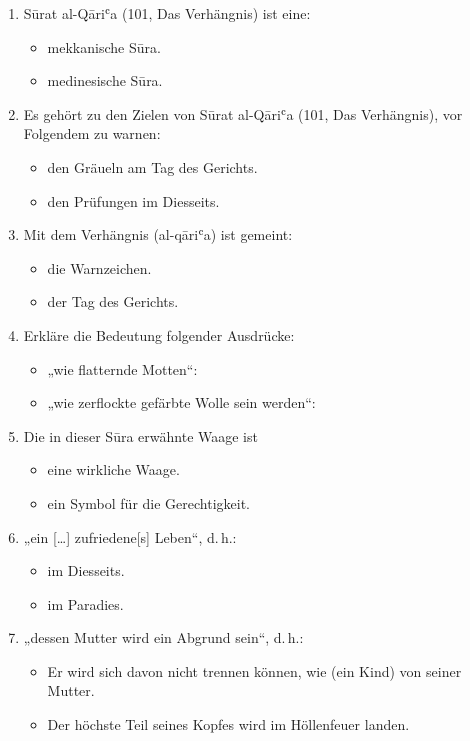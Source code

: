 \begin{enumerate}[leftmargin=1.6em,resume]
\item Sūrat al-Qāriʿa (101, Das Verhängnis) ist eine:
  \begin{itemize}
    \item mekkanische Sūra. \item medinesische Sūra.
  \end{itemize}
\item Es gehört zu den Zielen von Sūrat al-Qāriʿa (101, Das Verhängnis), vor Folgendem zu
  warnen:
  \begin{itemize}
    \item den Gräueln am Tag des Gerichts. \item den Prüfungen im Diesseits.
  \end{itemize}
\item Mit dem Verhängnis (al-qāriʿa) ist gemeint:
  \begin{itemize}
    \item die Warnzeichen. \item der Tag des Gerichts.
  \end{itemize}
\item Erkläre die Bedeutung folgender Ausdrücke:
  \begin{itemize}
    \item „wie flatternde Motten“: \dotfill
    \item „wie zerflockte gefärbte Wolle sein werden“: \dotfill
  \end{itemize}
\item Die in dieser Sūra erwähnte Waage ist
  \begin{itemize}
    \item eine wirkliche Waage. \item ein Symbol für die Gerechtigkeit.
  \end{itemize}
\item „ein […] zufriedene[s] Leben“, d.\,h.:
  \begin{itemize}
    \item im Diesseits. \item im Paradies.
  \end{itemize}
\item „dessen Mutter wird ein Abgrund sein“, d.\,h.:
  \begin{itemize}
    \item Er wird sich davon nicht trennen können, wie (ein Kind) von seiner Mutter.
    \item Der höchste Teil seines Kopfes wird im Höllenfeuer landen.

\end{itemize}
\end{enumerate}

